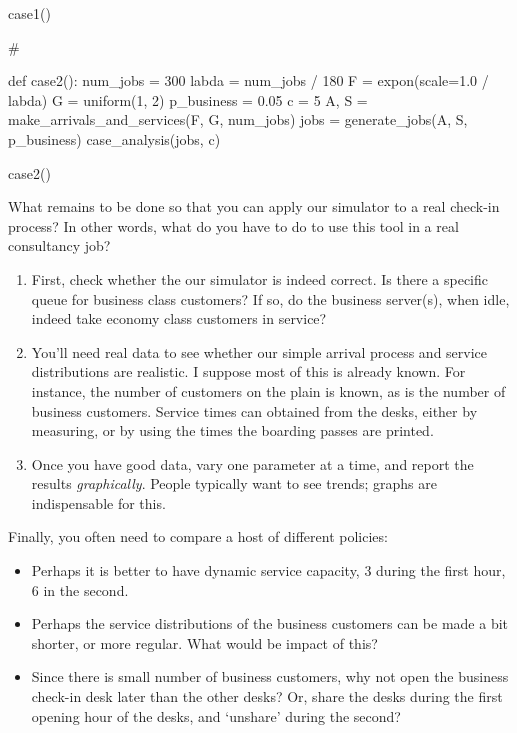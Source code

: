 \begin{exercise}
\begin{solution}
\begin{pyverbatim}
case1()

# %


def case2():
    num_jobs = 300
    labda = num_jobs / 180
    F = expon(scale=1.0 / labda)
    G = uniform(1, 2)
    p_business = 0.05
    c = 5
    A, S = make_arrivals_and_services(F, G, num_jobs)
    jobs = generate_jobs(A, S, p_business)
    case_analysis(jobs, c)


case2()
    \end{pyverbatim}
  \end{solution}
\end{exercise}



\begin{exercise}
  What remains to be done so that you can  apply our simulator to a real check-in process? In other words,  what do you  have to do to use this tool in a real consultancy job?

\begin{solution}
    \begin{enumerate}
    \item First, check whether the our simulator is indeed correct.
      Is there a specific queue for business class customers?
      If so, do the business server(s), when idle, indeed take economy class customers in service?
    \item You'll need real data to see whether our simple arrival process and service distributions are realistic.     I suppose most of this is already known. For instance, the number of customers on the plain is known, as is the number of business customers. Service times can obtained from the desks, either by measuring, or by using the times the boarding passes are printed.
    \item Once you have good data, vary one parameter at a time, and report the results \emph{graphically}.
      People typically want to see trends; graphs are indispensable for this.
    \end{enumerate}

    Finally, you often need to compare a host of different policies:
    \begin{itemize}
    \item Perhaps it is better to have  dynamic service capacity, 3 during the first hour, 6 in the second.
    \item Perhaps the service distributions of the business customers can be made a bit shorter, or more regular. What would be impact of this?
    \item Since there is small number of business customers, why not open the business check-in desk later than the other desks?
      Or, share the desks during the first opening hour of the desks, and `unshare' during the second?
    \end{itemize}

  \end{solution}
\end{exercise}


